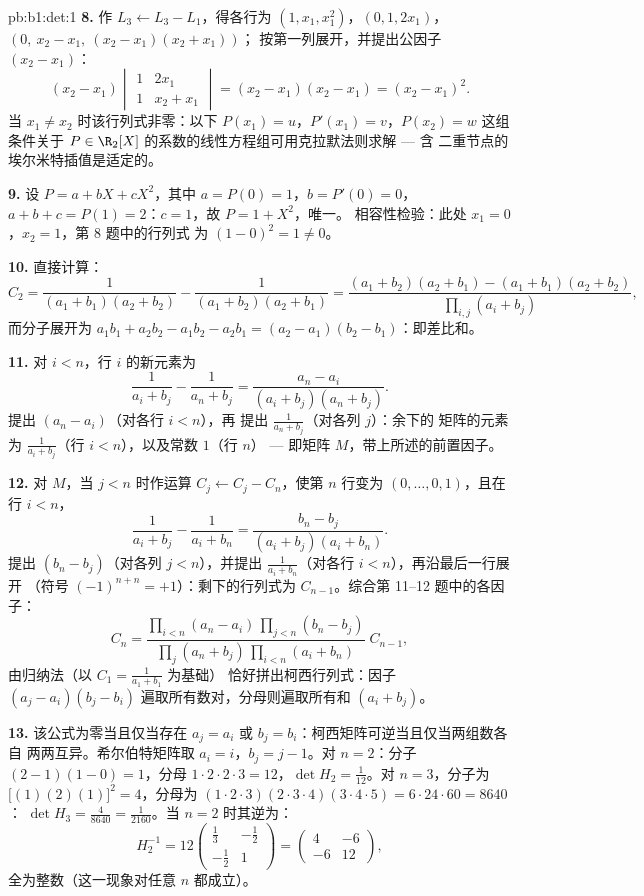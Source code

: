 \begin{solution}{pb:b1:det:1}
\textbf{8.} 作 $L_3 \leftarrow L_3 - L_1$，得各行为 $(1, x_1,
x_1^2)$，$(0, 1, 2x_1)$，$(0,\ x_2 - x_1,\ (x_2-x_1)(x_2+x_1))$；
按第一列展开，并提出公因子 $(x_2 - x_1)$：
\[
(x_2 - x_1)\begin{vmatrix} 1 & 2x_1\\ 1 & x_2 + x_1
\end{vmatrix} = (x_2 - x_1)(x_2 - x_1) = (x_2 - x_1)^2 .
\]
当 $x_1 \neq x_2$ 时该行列式非零：以下
$P(x_1) = u$，$P'(x_1) = v$，$P(x_2) = w$ 这组条件关于
$P \in \R_2[X]$ 的系数的线性方程组可用克拉默法则求解 --- 含
二重节点的 埃尔米特插值是适定的。

\textbf{9.} 设 $P = a + bX + cX^2$，其中 $a = P(0) = 1$，$b = P'(0)
= 0$，$a + b + c = P(1) = 2$：$c = 1$，故 $P = 1 + X^2$，唯一。
相容性检验：此处 $x_1 = 0$，$x_2 = 1$，第 8 题中的行列式
为 $(1 - 0)^2 = 1 \neq 0$。

\textbf{10.} 直接计算：
\[
C_2 = \frac{1}{(a_1+b_1)(a_2+b_2)} - \frac{1}{(a_1+b_2)(a_2+b_1)}
= \frac{(a_1+b_2)(a_2+b_1) - (a_1+b_1)(a_2+b_2)}
{\prod_{i,j}(a_i+b_j)} ,
\]
而分子展开为 $a_1b_1 + a_2b_2 - a_1b_2 - a_2b_1
= (a_2 - a_1)(b_2 - b_1)$：即差比和。

\textbf{11.} 对 $i < n$，行 $i$ 的新元素为
\[
\frac{1}{a_i + b_j} - \frac{1}{a_n + b_j}
= \frac{a_n - a_i}{(a_i + b_j)(a_n + b_j)} .
\]
提出 $(a_n - a_i)$（对各行 $i < n$），再
提出 $\frac1{a_n + b_j}$（对各列 $j$）：余下的
矩阵的元素为 $\frac1{a_i + b_j}$（行 $i < n$），以及常数 $1$（行 $n$）
--- 即矩阵 $M$，带上所述的前置因子。

\textbf{12.} 对 $M$，当 $j < n$ 时作运算 $C_j \leftarrow
C_j - C_n$，使第 $n$ 行变为 $(0, \dots, 0, 1)$，且在行 $i
< n$，
\[
\frac{1}{a_i + b_j} - \frac{1}{a_i + b_n}
= \frac{b_n - b_j}{(a_i + b_j)(a_i + b_n)} .
\]
提出 $(b_n - b_j)$（对各列 $j < n$），并提出 $\frac1{a_i +
b_n}$（对各行 $i < n$），再沿最后一行展开
（符号 $(-1)^{n+n} = +1$）：剩下的行列式为
$C_{n-1}$。综合第 11--12 题中的各因子：
\[
C_n = \frac{\prod_{i<n}(a_n - a_i)\,\prod_{j<n}(b_n - b_j)}
{\prod_{j}(a_n + b_j)\,\prod_{i<n}(a_i + b_n)}\;C_{n-1},
\]
由归纳法（以 $C_1 = \frac1{a_1+b_1}$ 为基础）
恰好拼出柯西行列式：因子 $(a_j - a_i)(b_j
- b_i)$ 遍取所有数对，分母则遍取所有和 $(a_i + b_j)$。

\textbf{13.} 该公式为零当且仅当存在 $a_j = a_i$ 或 $b_j =
b_i$：柯西矩阵可逆当且仅当两组数各自
两两互异。希尔伯特矩阵取 $a_i = i$，$b_j = j - 1$。对 $n =
2$：分子 $(2-1)(1-0) = 1$，分母 $1\cdot2\cdot2\cdot3
= 12$，$\det H_2 = \frac1{12}$。对 $n = 3$，分子为
$\bigl[(1)(2)(1)\bigr]^2 = 4$，分母为 $(1\cdot2\cdot3)
(2\cdot3\cdot4)(3\cdot4\cdot5) = 6\cdot24\cdot60 = 8640$：
$\det H_3 = \frac{4}{8640} = \frac1{2160}$。当 $n = 2$ 时其逆为：
\[
H_2^{-1} = 12\begin{pmatrix} \frac13 & -\frac12\\[2pt]
-\frac12 & 1\end{pmatrix}
= \begin{pmatrix} 4 & -6\\ -6 & 12 \end{pmatrix},
\]
全为整数（这一现象对任意 $n$ 都成立）。


\end{solution}
